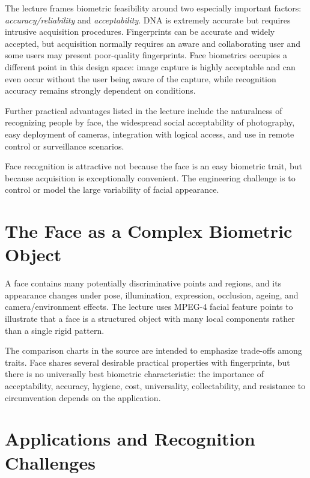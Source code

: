 \documentclass[11pt,a4paper,oneside]{report}
\begin{document}
The lecture frames biometric feasibility around two especially important
factors: \emph{accuracy/reliability} and \emph{acceptability}.  DNA is extremely
accurate but requires intrusive acquisition procedures.  Fingerprints can be
accurate and widely accepted, but acquisition normally requires an aware and
collaborating user and some users may present poor-quality fingerprints.  Face
biometrics occupies a different point in this design space: image capture is
highly acceptable and can even occur without the user being aware of the
capture, while recognition accuracy remains strongly dependent on conditions.

Further practical advantages listed in the lecture include the naturalness of
recognizing people by face, the widespread social acceptability of photography,
easy deployment of cameras, integration with logical access, and use in remote
control or surveillance scenarios.

\begin{keyconcept}
Face recognition is attractive not because the face is an easy biometric trait,
but because acquisition is exceptionally convenient.  The engineering challenge
is to control or model the large variability of facial appearance.
\end{keyconcept}

\section{The Face as a Complex Biometric Object}

A face contains many potentially discriminative points and regions, and its
appearance changes under pose, illumination, expression, occlusion, ageing, and
camera/environment effects.  The lecture uses MPEG-4 facial feature points to
illustrate that a face is a structured object with many local components rather
than a single rigid pattern.

The comparison charts in the source are intended to emphasize trade-offs among
traits.  Face shares several desirable practical properties with fingerprints,
but there is no universally best biometric characteristic: the importance of
acceptability, accuracy, hygiene, cost, universality, collectability, and
resistance to circumvention depends on the application.

\section{Applications and Recognition Challenges}
\end{document}
